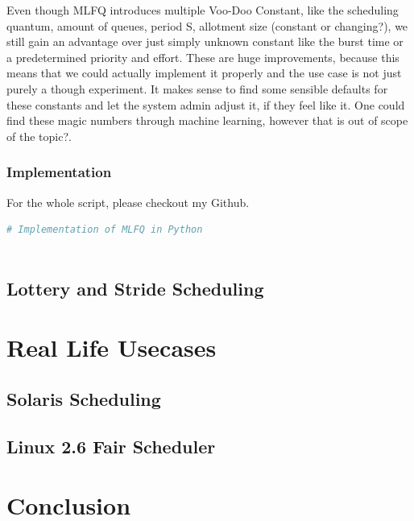 \documentclass{report}
\begin{document}
Even though MLFQ introduces multiple Voo-Doo Constant, like the scheduling quantum, amount of queues, period S, allotment size (constant or changing?), %
we still gain an advantage over just simply unknown constant like the burst time or a predetermined priority and effort. These are huge improvements, because this means that we could actually implement it properly and the use case is not just purely a though experiment. 
It makes sense to find some sensible defaults for these constants and let the system admin adjust it, if they feel like it. One could find these magic numbers through machine learning, however that is out of scope of the topic?.
\section{Implementation}

For the whole script, please checkout my Github.

\begin{lstlisting}[language=Python, style=colorEX, label=cd:mlfq-python]
  # Implementation of MLFQ in Python
  
\end{lstlisting}

\chapter{Lottery and Stride Scheduling}

\part{Real Life Usecases}

\chapter{Solaris Scheduling}

\chapter{Linux 2.6 Fair Scheduler}



\part{Conclusion}
\end{document}
